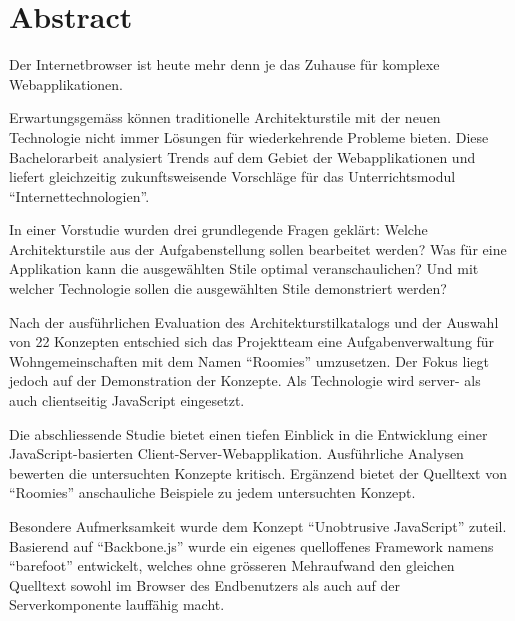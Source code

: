 \clearpage
\thispagestyle{empty}

\section*{Abstract}

Der Internetbrowser ist heute mehr denn je das Zuhause für komplexe Webapplikationen.

Erwartungsgemäss können traditionelle Architekturstile mit der neuen Technologie nicht immer Lösungen für wiederkehrende Probleme bieten. Diese Bachelorarbeit analysiert Trends auf dem Gebiet der Webapplikationen und liefert gleichzeitig zukunftsweisende Vorschläge für das Unterrichtsmodul ``Internettechnologien''.

In einer Vorstudie wurden drei grundlegende Fragen geklärt: Welche Architekturstile aus der Aufgabenstellung sollen bearbeitet werden? Was für eine Applikation kann die ausgewählten Stile optimal veranschaulichen? Und mit welcher Technologie sollen die ausgewählten Stile demonstriert werden?

Nach der ausführlichen Evaluation des Architekturstilkatalogs und der Auswahl von 22 Konzepten entschied sich das Projektteam eine Aufgabenverwaltung für Wohngemeinschaften mit dem Namen ``Roomies'' umzusetzen. Der Fokus liegt jedoch auf der Demonstration der Konzepte. Als Technologie wird server- als auch clientseitig JavaScript eingesetzt.

Die abschliessende Studie bietet einen tiefen Einblick in die Entwicklung einer JavaScript-basierten Client-Server-Webapplikation. Ausführliche Analysen bewerten die untersuchten Konzepte kritisch. Ergänzend bietet der Quelltext von ``Roomies'' anschauliche Beispiele zu jedem untersuchten Konzept.

Besondere Aufmerksamkeit wurde dem Konzept ``Unobtrusive JavaScript'' zuteil. Basierend auf ``Backbone.js'' wurde ein eigenes quelloffenes Framework namens ``barefoot'' entwickelt, welches ohne grösseren Mehraufwand den gleichen Quelltext sowohl im Browser des Endbenutzers als auch auf der Serverkomponente lauffähig macht.

\clearpage